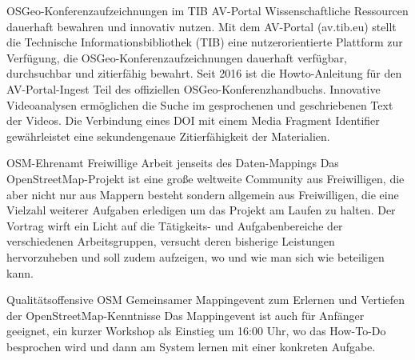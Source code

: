 %
{OSGeo-Konferenzaufzeichnungen im TIB AV-Portal\vspace{0.2\baselineskip}}%
{Wissenschaftliche Ressourcen dauerhaft bewahren und innovativ nutzen.}%
{Mit dem AV-Portal (av.tib.eu) stellt die Technische Informationsbibliothek (TIB) eine
nutzerorientierte Plattform zur Verfügung, die OSGeo-Konferenzaufzeichnungen dauerhaft verfügbar,
durchsuchbar und zitierfähig bewahrt. Seit 2016 ist die Howto-Anleitung für den AV-Portal-Ingest
Teil des offiziellen OSGeo-Konferenzhandbuchs. Innovative  Videoanalysen ermöglichen die Suche im
gesprochenen und geschriebenen Text der Videos. Die Verbindung eines DOI mit einem Media Fragment
Identifier gewährleistet eine sekundengenaue Zitierfähigkeit der Materialien.}



%
{OSM-Ehrenamt}%
{Freiwillige Arbeit jenseits des Daten-Mappings}%
{Das OpenStreetMap-Projekt ist eine große weltweite Community aus
Freiwilligen, die aber nicht nur aus Mappern besteht sondern allgemein
aus Freiwilligen, die eine Vielzahl weiterer Aufgaben erledigen um das
Projekt am Laufen zu halten. Der Vortrag wirft ein Licht auf die
Tätigkeits- und Aufgabenbereiche der verschiedenen Arbeitsgruppen,
versucht deren bisherige Leistungen hervorzuheben und soll zudem
aufzeigen, wo und wie man sich wie beteiligen kann.}

%
{Qualitätsoffensive OSM}%
{Gemeinsamer Mappingevent zum Erlernen und Vertiefen der OpenStreetMap-Kenntnisse}%
{Das Mappingevent ist auch für Anfänger geeignet, ein kurzer Workshop als
Einstieg um 16:00 Uhr, wo das How-To-Do besprochen wird und dann am System lernen
mit einer konkreten Aufgabe.}


\vfill

\vfill


